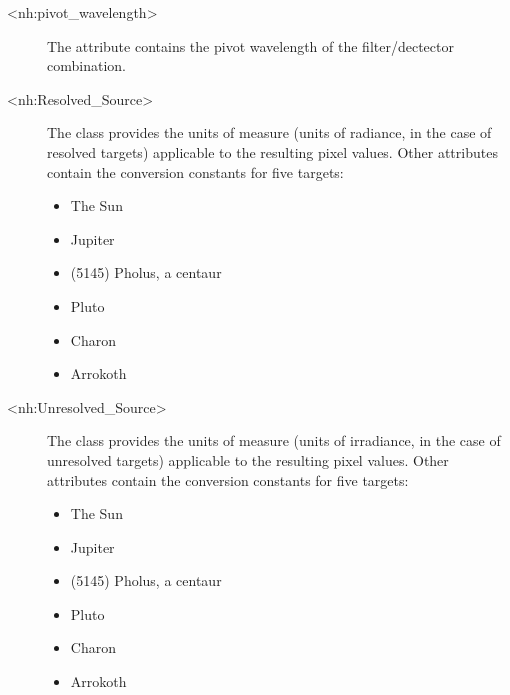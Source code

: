 \documentclass[letterpaper,10pt,english]{sphinxmanual}
\begin{document}
\begin{description}
\item[{\textless{}nh:pivot\_wavelength\textgreater{}}] \leavevmode
\sphinxAtStartPar
The  attribute contains the pivot wavelength of the
filter/dectector combination.

\item[{\textless{}nh:Resolved\_Source\textgreater{}}] \leavevmode
\sphinxAtStartPar
The  class provides the units of measure (units of radiance,
in the case of resolved targets) applicable to the resulting pixel values.
Other attributes contain the conversion constants for five targets:
\begin{itemize}
\item {} 
\sphinxAtStartPar
The Sun

\item {} 
\sphinxAtStartPar
Jupiter

\item {} 
\sphinxAtStartPar
(5145) Pholus, a centaur

\item {} 
\sphinxAtStartPar
Pluto

\item {} 
\sphinxAtStartPar
Charon

\item {} 
\sphinxAtStartPar
Arrokoth

\end{itemize}

\item[{\textless{}nh:Unresolved\_Source\textgreater{}}] \leavevmode
\sphinxAtStartPar
The  class provides the units of measure (units of
irradiance, in the case of unresolved targets) applicable to the resulting pixel
values. Other attributes contain the conversion constants for five targets:
\begin{itemize}
\item {} 
\sphinxAtStartPar
The Sun

\item {} 
\sphinxAtStartPar
Jupiter

\item {} 
\sphinxAtStartPar
(5145) Pholus, a centaur

\item {} 
\sphinxAtStartPar
Pluto

\item {} 
\sphinxAtStartPar
Charon

\item {} 
\sphinxAtStartPar
Arrokoth

\end{itemize}

\end{description}
\end{document}
